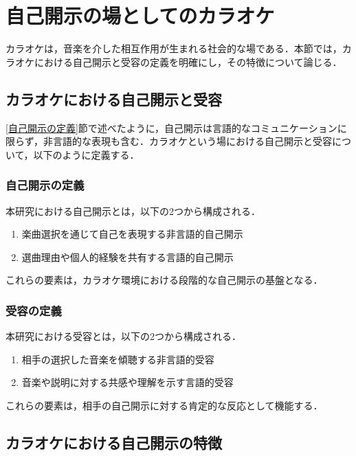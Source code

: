 \section{自己開示の場としてのカラオケ}\label{自己開示の場としてのカラオケ}
カラオケは，音楽を介した相互作用が生まれる社会的な場である．本節では，カラオケにおける自己開示と受容の定義を明確にし，その特徴について論じる．

\subsection{カラオケにおける自己開示と受容}
\ref{自己開示の定義}節で述べたように，自己開示は言語的なコミュニケーションに限らず，非言語的な表現も含む．カラオケという場における自己開示と受容について，以下のように定義する．

\subsubsection{自己開示の定義}

本研究における自己開示とは，以下の2つから構成される．

\begin{enumerate}
    \item 楽曲選択を通じて自己を表現する非言語的自己開示
    \item 選曲理由や個人的経験を共有する言語的自己開示
\end{enumerate}

これらの要素は，カラオケ環境における段階的な自己開示の基盤となる．

\subsubsection{受容の定義}
本研究における受容とは，以下の2つから構成される．

\begin{enumerate}
    \item 相手の選択した音楽を傾聴する非言語的受容
    \item 音楽や説明に対する共感や理解を示す言語的受容
\end{enumerate}

これらの要素は，相手の自己開示に対する肯定的な反応として機能する．


\subsection{カラオケにおける自己開示の特徴}

